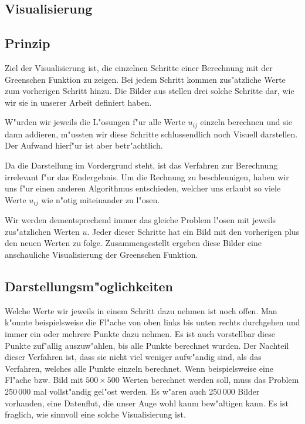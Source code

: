\begin{refsection}
\section{Visualisierung}
	
\subsection{Prinzip}
			
Ziel der Visualisierung ist, die einzelnen Schritte einer Berechnung
mit der Greenschen Funktion zu zeigen. Bei jedem Schritt kommen
zus"atzliche Werte zum vorherigen Schritt hinzu. Die Bilder aus
 stellen drei solche Schritte dar, wie wir
sie in unserer Arbeit definiert haben.
		
W"urden wir jeweils die L"osungen f"ur alle Werte $u_{ij}$ einzeln
berechnen und sie dann addieren, m"ussten wir diese Schritte
schlussendlich noch Visuell darstellen. Der Aufwand hierf"ur ist
aber betr"achtlich.

Da die Darstellung im Vordergrund steht, ist das Verfahren zur
Berechnung irrelevant f"ur das Endergebnis. Um die Rechnung zu
beschleunigen, haben wir uns f"ur einen anderen Algorithmus
entschieden, welcher uns erlaubt so viele Werte $u_{ij}$ wie n"otig
miteinander zu l"osen.
		
Wir werden dementsprechend immer das gleiche Problem l"osen mit
jeweils zus"atzlichen Werten $u$. Jeder dieser Schritte hat ein
Bild mit den vorherigen plus den neuen Werten zu folge. Zusammengestellt
ergeben diese Bilder eine anschauliche Visualisierung der Greenschen
Funktion.
	
	
\subsection{Darstellungsm"oglichkeiten}
	
Welche Werte wir jeweils in einem Schritt dazu nehmen ist noch
offen. Man k"onnte beispielsweise die Fl"ache von oben links bis
unten rechts durchgehen und immer ein oder mehrere Punkte dazu
nehmen. Es ist auch vorstellbar diese Punkte zuf"allig auszuw"ahlen,
bis alle Punkte berechnet wurden. Der Nachteil dieser Verfahren
ist, dass sie nicht viel weniger aufw"andig sind, als das Verfahren,
welches alle Punkte einzeln berechnet. Wenn beispielsweise eine
Fl"ache bzw. Bild mit $500 \times 500$ Werten berechnet werden soll,
muss das Problem 250\,000 mal vollst"andig gel"ost werden. Es w"aren
auch 250\,000 Bilder vorhanden, eine Datenflut, die unser Auge wohl
kaum bew"altigen kann. Es ist fraglich, wie sinnvoll eine solche
Visualisierung ist.
		

\end{refsection}
